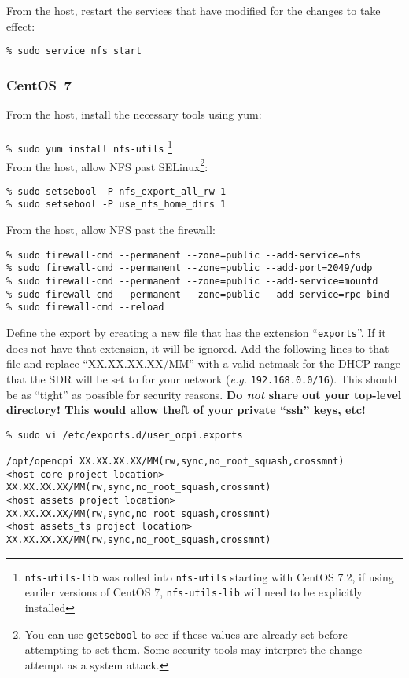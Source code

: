 From the host, restart the services that have modified for the changes to take effect:
\begin{verbatim}
% sudo service nfs start
\end{verbatim}

\subsubsection{CentOS~7}
From the host, install the necessary tools using yum:\\
~\\
\verb+% sudo yum install nfs-utils+ \footnote{\texttt{nfs-utils-lib} was rolled into \texttt{nfs-utils} starting with CentOS 7.2, if using eariler versions of CentOS 7, \texttt{nfs-utils-lib} will need to be explicitly installed}
~\\

From the host, allow NFS past SELinux\footnote{You can use \texttt{getsebool} to see if these values are already set before attempting to set them. Some security tools may interpret the change attempt as a system attack.}:
\begin{verbatim}
% sudo setsebool -P nfs_export_all_rw 1
% sudo setsebool -P use_nfs_home_dirs 1
\end{verbatim}

From the host, allow NFS past the firewall:
\begin{verbatim}
% sudo firewall-cmd --permanent --zone=public --add-service=nfs
% sudo firewall-cmd --permanent --zone=public --add-port=2049/udp
% sudo firewall-cmd --permanent --zone=public --add-service=mountd
% sudo firewall-cmd --permanent --zone=public --add-service=rpc-bind
% sudo firewall-cmd --reload
\end{verbatim}

Define the export by creating a new file that has the extension ``\texttt{exports}''.
If it does not have that extension, it will be ignored.
Add the following lines to that file and replace ``XX.XX.XX.XX/MM'' with a valid netmask for the DHCP range that the SDR will be set to for your network (\textit{e.g.} \texttt{192.168.0.0/16}).
This should be as ``tight'' as possible for security reasons. \textbf{Do \textit{not} share out your top-level directory! This would allow theft of your private ``ssh'' keys, etc!} %

\begin{verbatim}
% sudo vi /etc/exports.d/user_ocpi.exports

/opt/opencpi XX.XX.XX.XX/MM(rw,sync,no_root_squash,crossmnt)
<host core project location> XX.XX.XX.XX/MM(rw,sync,no_root_squash,crossmnt)
<host assets project location> XX.XX.XX.XX/MM(rw,sync,no_root_squash,crossmnt)
<host assets_ts project location> XX.XX.XX.XX/MM(rw,sync,no_root_squash,crossmnt)
\end{verbatim}

